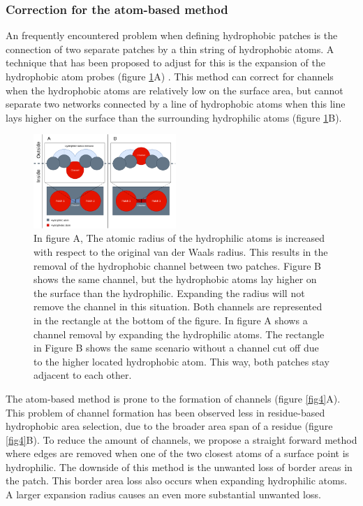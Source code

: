 \documentclass[11pt,a4paper]{article}
\begin{document}
\subsubsection{Correction for the atom-based method}
An frequently encountered problem when defining hydrophobic patches is the connection of two separate patches by a thin string of hydrophobic atoms. A technique that has been proposed to adjust for this is the expansion of the hydrophobic atom probes (figure \ref{fig3}A) \cite{eisenhaber1996hydrophobic}. This method can correct for channels when the hydrophobic atoms are relatively low on the surface area, but cannot separate two networks connected by a line of hydrophobic atoms when this line lays higher on the surface than the surrounding hydrophilic atoms  (figure \ref{fig3}B).

\begin{figure}[h!]
  \centering
  \includegraphics[width=0.48\textwidth]{figures/figure_draft_final2.png}
  \caption{In figure A, The atomic radius of the hydrophilic atoms is increased with respect to the original van der Waals radius. This results in the removal of the hydrophobic channel between two patches. Figure B shows the same channel, but the hydrophobic atoms lay higher on the surface than the hydrophilic. Expanding the radius will not remove the channel in this situation. Both channels are represented in the rectangle at the bottom of the figure. In figure A shows a channel removal by expanding the hydrophilic atoms. The rectangle in Figure B shows the same scenario without a channel cut off due to the higher located hydrophobic atom. This way, both patches stay adjacent to each other.
}
\label{fig3}
\end{figure}

The atom-based method is prone to the formation of channels (figure \ref{fig4}A). This problem of channel formation has been observed less in residue-based hydrophobic area selection, due to the broader area span of a residue (figure \ref{fig4}B). To reduce the amount of channels, we propose a straight forward method where edges are removed when one of the two closest atoms of a surface point is hydrophilic. The downside of this method is the unwanted loss of border areas in the patch. This border area loss also occurs when expanding hydrophilic atoms. A larger expansion radius causes an even more substantial unwanted loss.
\end{document}
